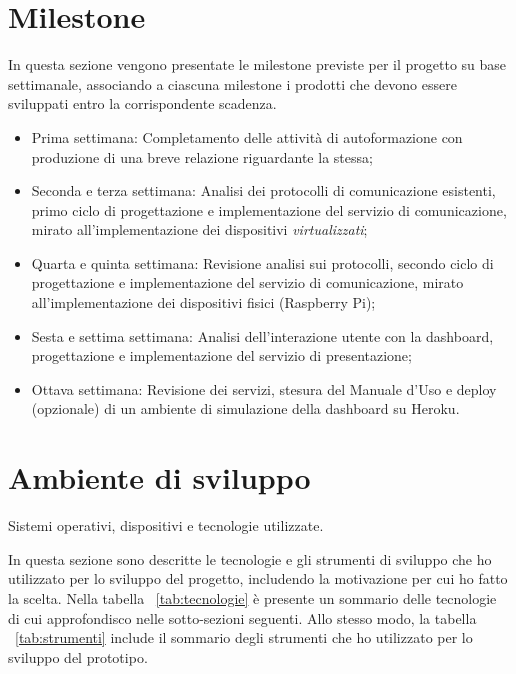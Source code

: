 \clearpage
\section*{Milestone}
In questa sezione vengono presentate le milestone previste per il progetto su base settimanale, associando a ciascuna milestone i prodotti che devono essere sviluppati entro la corrispondente scadenza.
\begin{itemize}
	\item Prima settimana: Completamento delle attività di autoformazione con produzione di una breve relazione riguardante la stessa;
	\item Seconda e terza settimana: Analisi dei protocolli di comunicazione esistenti, primo ciclo di progettazione e implementazione del servizio di comunicazione, mirato all'implementazione dei dispositivi \textit{virtualizzati};
	\item Quarta e quinta settimana: Revisione analisi sui protocolli, secondo ciclo di progettazione e implementazione del servizio di comunicazione, mirato all'implementazione dei dispositivi fisici (Raspberry Pi);
	\item Sesta e settima settimana: Analisi dell'interazione utente con la dashboard, progettazione e implementazione del servizio di presentazione;
	\item Ottava settimana: Revisione dei servizi, stesura del Manuale d'Uso e deploy (opzionale) di un ambiente di simulazione della dashboard su Heroku.
\end{itemize}

\section{Ambiente di sviluppo}

Sistemi operativi, dispositivi e tecnologie utilizzate.

In questa sezione sono descritte le tecnologie e gli strumenti di sviluppo che ho utilizzato per lo sviluppo del progetto, includendo la motivazione per cui ho fatto la scelta.
Nella tabella ~\ref{tab:tecnologie} è presente un sommario delle tecnologie di cui approfondisco nelle sotto-sezioni seguenti. Allo stesso modo, la tabella ~\ref{tab:strumenti} include il sommario degli strumenti che ho utilizzato per lo sviluppo del prototipo. 


